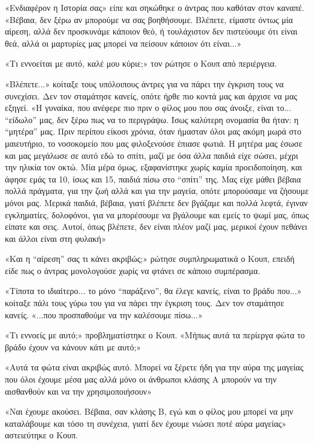 \documentclass[12pt,twoside, openany]{book}
\begin{document}
«Ενδιαφέρον η Ιστορία σας» είπε και σηκώθηκε ο άντρας που καθόταν στον καναπέ. «Βέβαια, δεν ξέρω αν μπορούμε να σας βοηθήσουμε. Βλέπετε, είμαστε όντως μία αίρεση, αλλά δεν προσκυνάμε κάποιον θεό, ή τουλάχιστον δεν πιστεύουμε ότι είναι θεά, αλλά οι μαρτυρίες μας μπορεί να πείσουν κάποιον ότι είναι...»

«Τι εννοείται με αυτό, καλέ μου κύριε;» τον ρώτησε ο Κουπ από περιέργεια.

«Βλέπετε...» κοίταξε τους υπόλοιπους άντρες για να πάρει την έγκριση τους να συνεχίσει. Δεν τον σταμάτησε κανείς, οπότε ήρθε πιο κοντά μας και άρχισε να μας εξηγεί. «Η γυναίκα, που ανέφερε πιο πριν ο φίλος μου που σας άνοιξε, είναι το... “είδωλο” μας, δεν ξέρω πως να το περιγράψω. Ίσως καλύτερη ονομασία θα ήταν: η “μητέρα” μας. Πριν περίπου είκοσι χρόνια, όταν ήμασταν όλοι μας ακόμη μωρά στο μαιευτήριο, το νοσοκομείο που μας φιλοξενούσε έπιασε φωτιά. Η μητέρα μας έσωσε και μας μεγάλωσε σε αυτό εδώ το σπίτι, μαζί με όσα άλλα παιδιά είχε σώσει, μέχρι την ηλικία τον οκτώ. Μία μέρα όμως, εξαφανίστηκε χωρίς καμία προειδοποίηση, και άφησε εμάς τα 10, ίσως και 15, παιδιά πίσω στο “σπίτι” της. Μας είχε μάθει βέβαια πολλά πράγματα, για την ζωή αλλά και για την μαγεία, οπότε μπορούσαμε να ζήσουμε μόνοι μας. Μερικά παιδιά, βέβαια, γιατί βλέπετε δεν βγάζαμε και πολλά λεφτά, έγιναν εγκληματίες, δολοφόνοι, για να μπορέσουμε να βγάλουμε και εμείς το ψωμί μας, όπως είπατε και σεις. Αυτοί, όπως βλέπετε, δεν είναι πλέον μαζί μας, μερικοί έχουν πεθάνει και άλλοι είναι στη φυλακή»

«Και η “αίρεση” σας τι κάνει ακριβώς;» ρώτησε συμπληρωματικά ο Κουπ, επειδή είδε πως ο άντρας μονολογούσε χωρίς να φτάνει σε κάποιο συμπέρασμα.

«Τίποτα το ιδιαίτερο... το μόνο “παράξενο”, θα έλεγε κανείς, είναι το βράδυ που...» κοίταξε πάλι τους γύρω του για να πάρει την έγκριση τους. Δεν τον σταμάτησε κανείς. «...που προσπαθούμε να την καλέσουμε πίσω...»

«Τι εννοείς με αυτό;» προβληματίστηκε ο Κουπ. «Μήπως αυτά τα περίεργα φώτα το βράδυ έχουν να κάνουν κάτι με αυτό;»

«Αυτά τα φώτα είναι ακριβώς αυτό. Μπορεί να ξέρετε ήδη για την αύρα της μαγείας που όλοι έχουμε μέσα μας αλλά μόνο οι άνθρωποι κλάσης Α μπορούν να την αισθανθούν και να την χρησιμοποιήσουν»

«Ναι έχουμε ακούσει. Βέβαια, σαν κλάσης Β, εγώ και ο φίλος μου μπορεί να μην καταλάβουμε και τόσο τη συνέχεια, γιατί δεν έχουμε νιώσει ποτέ αύρα μαγείας» αστειεύτηκε ο Κουπ.
\end{document}
